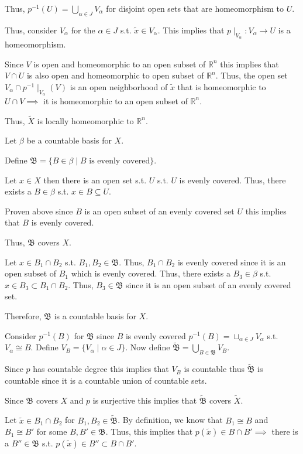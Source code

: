 \documentclass[12pt, letterpaper]{article}
\newcommand{\R}{\mathbb{R}}
\renewcommand{\t}[1]{\text{#1}}
\begin{document}
\begin{problemproof}
  Thus, $p^{-1}(U)= \bigcup_{\alpha \in J}V_\alpha$ for disjoint open sets that are homeomorphism to $U$.
  
  Thus, consider $V_\alpha$ for the $\alpha \in J$ s.t. $\widetilde{x} \in V_\alpha$. This implies that $p \mid_{V_\alpha} : V_\alpha \to U$ is a homeomorphism.
  
  Since $V$ is open and homeomorphic to an open subset of $\R^n$ this implies that $V \cap U$ is also open and homeomorphic to open subset of $\R^n$. Thus, the open set $V_\alpha \cap p^{-1}\mid_{V_\alpha}(V)$ is an open neighborhood of $\widetilde{x}$ that is homeomorphic to $U \cap V \implies$ it is homeomorphic to an open subset of $\R^n$.

  Thus, $\widetilde{X}$ is locally homeomorphic to $\R^n$.

  Let $\beta$ be a countable basis for $X$.

  Define $\mathfrak{B}=\{B \in \beta \mid B \t{ is evenly covered}\}$.

  Let $x \in X$ then there is an open set s.t. $U$ s.t. $U$ is evenly covered. Thus, there exists a $B \in \beta$ s.t. $x \in B \subseteq U$.

  Proven above since $B$ is an open subset of an evenly covered set $U$ this implies that $B$ is evenly covered.

  Thus, $\mathfrak{B}$ covers $X$.

  Let $x \in B_1 \cap B_2$ s.t. $B_1, B_2 \in \mathfrak{B}$. Thus, $B_1 \cap B_2$ is evenly covered since it is an open subset of $B_1$ which is evenly covered. Thus, there exists a $B_3 \in \beta$ s.t. $x \in B_3 \subset B_1 \cap B_2$. Thus, $B_3 \in \mathfrak{B}$ since it is an open subset of an evenly covered set.

  Therefore, $\mathfrak{B}$ is a countable basis for $X$.

  Consider $p^{-1}(B)$ for $\mathfrak{B}$ since $B$ is evenly covered $p^{-1}(B)=\sqcup_{\alpha \in J}V_\alpha$ s.t. $V_\alpha \cong B$. Define $V_B=\{V_\alpha \mid \alpha \in J\}$. Now define $\widetilde{\mathfrak{B}}=\bigcup_{B \in \mathfrak{B}} V_B$.

  Since $p$ has countable degree this implies that $V_B$ is countable thus $\widetilde{\mathfrak{B}}$ is countable since it is a countable union of countable sets.

  Since $\mathfrak{B}$ covers $X$ and $p$ is surjective this implies that $\widetilde{\mathfrak{B}}$ covers $\widetilde{X}$.

  Let $\widetilde{x} \in B_1 \cap B_2$ for $B_1,B_2 \in \widetilde{\mathfrak{B}}$. By definition, we know that $B_1 \cong B$ and $B_1 \cong B'$ for some $B,B' \in \mathfrak{B}$. Thus, this implies that $p(\widetilde{x}) \in B \cap B' \implies$ there is a $B'' \in \mathfrak{B}$ s.t. $p(\widetilde{x}) \in B'' \subset B \cap B'$.


\end{problemproof}
\end{document}
